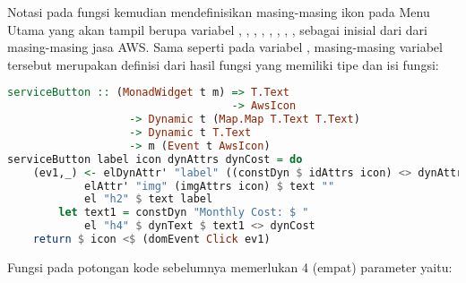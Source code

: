 \documentclass[pi.tex]{subfile}
\begin{document}
     \hspace{10pt}Notasi  pada fungsi  kemudian mendefinisikan masing-masing ikon pada Menu Utama yang akan tampil berupa variabel , , , , , , , ,  sebagai inisial dari dari masing-masing jasa AWS. Sama seperti pada variabel , masing-masing variabel tersebut merupakan definisi dari hasil fungsi  yang memiliki tipe dan isi fungsi:\\
\begin{lstlisting}[language=Haskell]
serviceButton :: (MonadWidget t m) => T.Text
                                   -> AwsIcon
				   -> Dynamic t (Map.Map T.Text T.Text)
				   -> Dynamic t T.Text
				   -> m (Event t AwsIcon)
serviceButton label icon dynAttrs dynCost = do
    (ev1,_) <- elDynAttr' "label" ((constDyn $ idAttrs icon) <> dynAttrs) $ do
            elAttr' "img" (imgAttrs icon) $ text ""
            el "h2" $ text label
	    let text1 = constDyn "Monthly Cost: $ "
            el "h4" $ dynText $ text1 <> dynCost
    return $ icon <$ (domEvent Click ev1)
\end{lstlisting}
\pagebreak
\hspace{10pt}Fungsi  pada potongan kode sebelumnya memerlukan 4 (empat) parameter yaitu:
\end{document}
